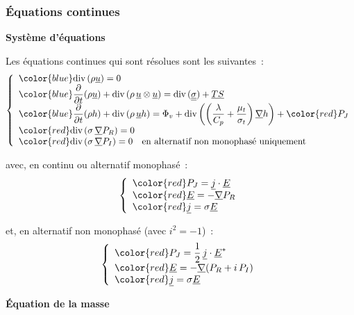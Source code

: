 \subsubsection*{Équations continues}

{\bf Système d'équations}
\nopagebreak

Les équations continues qui sont résolues sont les suivantes~:
\begin{equation}
\left\{\begin{array}{l}
{\color{blue}\dive(\rho \vect{u}) = 0}\\
{\color{blue}\displaystyle\frac{\partial}{\partial t}(\rho \vect{u})
+\dive(\rho\, \vect{u} \otimes \vect{u})
=\dive(\tens{\sigma}) + \vect{TS}}  \\
{\color{blue}\displaystyle\frac{\partial}{\partial t}(\rho h)
+\dive(\rho\, \vect{u} h)
=\Phi_v +
\dive{\left(\left(\frac{\lambda}{C_p}+\frac{\mu_t}{\sigma_t}\right)\grad{h}\right)}
+ {\color{red}P_J}}\\
{\color{red}\dive(\sigma\,\grad{P_R})=0}\\
{\color{red}\dive(\sigma\,\grad{P_I})=0}\text{\ \ \ en alternatif non monophasé uniquement}\\
\end{array}\right.
\end{equation}

avec, en continu ou alternatif monophasé~:
\begin{equation}
\left\{\begin{array}{l}
{\color{red}P_J=\vect{j}\cdot\vect{E}} \\
{\color{red}\vect{E}=-\grad{P_R}}\\
{\color{red}\vect{j}=\sigma\vect{E}}\\
\end{array}\right.
\end{equation}

et, en alternatif non monophasé (avec $i^2=-1$)~:
\begin{equation}
\left\{\begin{array}{l}
{\color{red}\displaystyle P_J=\frac{1}{2}\,\vect{j}\cdot\vect{E}^*}\\
{\color{red}\vect{E}=-\grad{(P_R+i\,P_I)}}\\
{\color{red}\vect{j}=\sigma\vect{E}}\\
\end{array}\right.
\end{equation}

\vspace*{0,5cm}
{\bf Équation de la masse}
\nopagebreak

